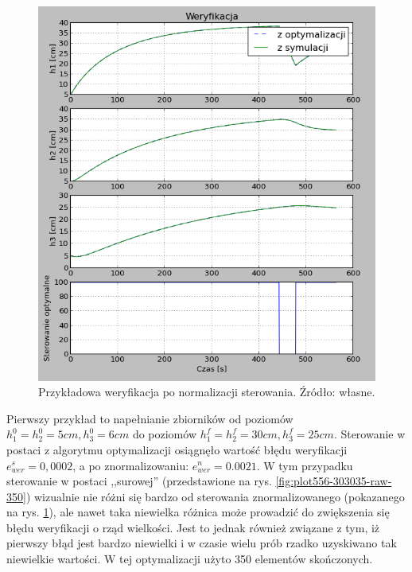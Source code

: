 \begin{figure}[htp]
    \centering
    \includegraphics{Grafika/plot_5_5_6-30_30_25-normalised-350}
    \caption{Przykładowa weryfikacja po normalizacji sterowania. Źródło: własne.}
    \label{fig:plot556-303035-normalised-350}
\end{figure}

Pierwszy przykład to napełnianie zbiorników od poziomów $h_{1}^{0} = h_{2}^{0} = 5 cm, h_{3}^{0} = 6 cm$ do poziomów $h_{1}^{f} = h_{2}^{f} = 30 cm, h_{3}^{f} = 25 cm$. Sterowanie w postaci z algorytmu optymalizacji osiągnęło wartość błędu weryfikacji $e_{wer}^{s} = 0,0002$, a po znormalizowaniu: $e_{wer}^{n} = 0.0021$. W tym przypadku sterowanie w postaci ,,surowej'' (przedstawione na rys. \ref{fig:plot556-303035-raw-350}) wizualnie nie różni się bardzo od sterowania znormalizowanego (pokazanego na rys. \ref{fig:plot556-303035-normalised-350}), ale nawet taka niewielka różnica może prowadzić do zwiększenia się błędu weryfikacji o rząd wielkości. Jest to jednak również związane z tym, iż pierwszy błąd jest bardzo niewielki i w czasie wielu prób rzadko uzyskiwano tak niewielkie wartości. W tej optymalizacji użyto 350 elementów skończonych.

